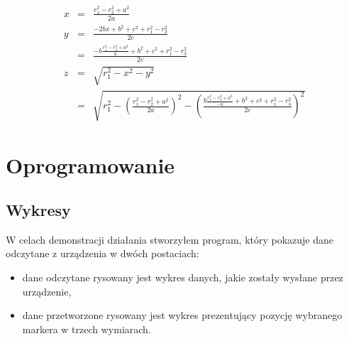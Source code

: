 \begin{eqnarray}
 x & = & \frac{r_1^2 - r_2^2 + a^2}{2a} \label{eq:trilateration_final_x}\\
 y & = & \frac{-2bx + b^2 + c^2 + r_1^2 - r_3^2}{2c} \label{eq:trilateration_final_y}\\
   & = & \frac{-b\frac{r_1^2 - r_2^2 + a^2}{a} + b^2 + c^2 + r_1^2 - r_3^2}{2c} \nonumber \\
 z & = & \sqrt{r_1^2 - x^2 - y^2} \label{eq:trilateration_final_z}\\
   & = & \sqrt{r_1^2 - \left(\frac{r_1^2 - r_2^2 + a^2}{2a}\right)^2 - \left(\frac{b\frac{r_1^2 - r_2^2 + a^2}{-a} + b^2 + c^2 + r_1^2 - r_3^2}{2c}\right)^2} \nonumber
\end{eqnarray}

\section{Oprogramowanie}
\subsection{Wykresy}
W celach demonstracji działania stworzyłem program, który pokazuje dane odczytane z urządzenia w dwóch postaciach:
\begin{itemize}
 \item dane odczytane \ppauza rysowany jest wykres danych, jakie zostały wysłane przez urządzenie,
 \item dane przetworzone \ppauza rysowany jest wykres prezentujący pozycję wybranego markera w trzech wymiarach.
\end{itemize}
